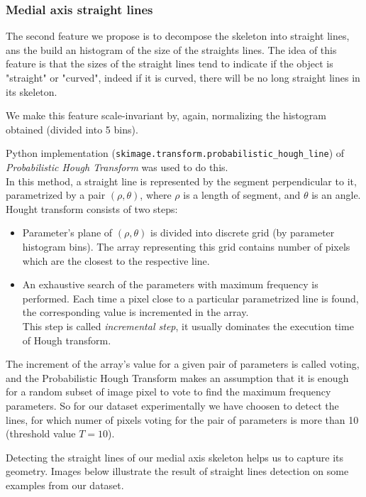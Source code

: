 \documentclass[12pt]{article}
\begin{document}
\subsubsection{Medial axis straight lines}

The second feature we propose is to decompose the skeleton into straight lines, ans the build an histogram of the size of the straights lines.
The idea of this feature is that the sizes of the straight lines tend to indicate if the object is "straight" or "curved", indeed if it is curved, there will be no long straight lines in its skeleton.

We make this feature scale-invariant by, again, normalizing the histogram obtained (divided into 5 bins).

Python implementation (\texttt{skimage.transform.probabilistic\_hough\_line}) of \textit{Probabilistic Hough Transform} \cite{Kiryati} was used to do this. \\
In this method, a straight line is represented by the segment perpendicular to it, parametrized by a pair $(\rho, \theta)$, where $\rho$ is a length of segment, and $\theta$ is an angle. \\
Hought transform consists of two steps: 
\begin{itemize}
  \item Parameter's plane of $(\rho, \theta)$ is divided into discrete grid (by parameter histogram bins). The array representing this grid contains number of pixels which are the closest to the respective line.
  \item An exhaustive search of the parameters with maximum frequency is performed. Each time a pixel close to a particular parametrized line is found, the corresponding value is incremented in the array.\\
  This step is called \textit{incremental step}, it usually dominates the execution time of Hough transform.
\end{itemize}

The increment of the array's value for a given pair of parameters is called voting, and the Probabilistic Hough Transform makes an assumption that it is enough for a random subset of image pixel to vote to find the maximum frequency parameters. So for our dataset experimentally we have choosen to detect the lines, for which numer of pixels voting for the pair of parameters is more than 10 (threshold value $T=10$).

Detecting the straight lines of our medial axis skeleton helps us to capture its geometry. Images below illustrate the result of straight lines detection on some examples from our dataset.
\end{document}
